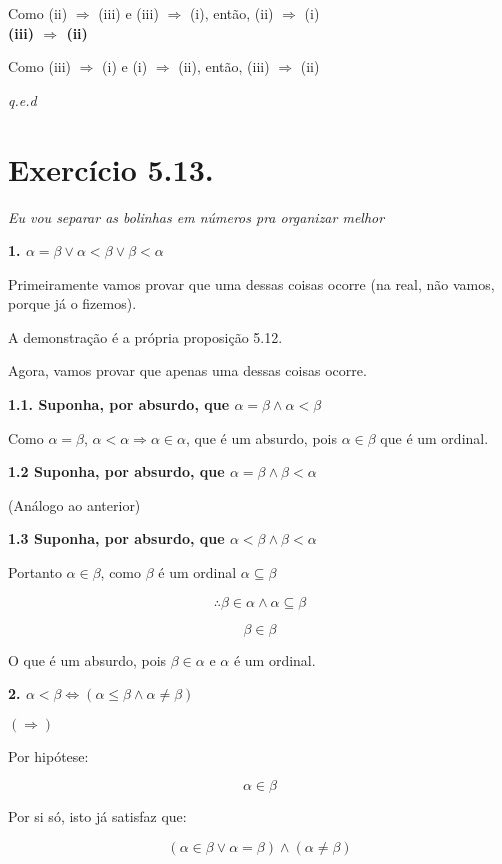 \documentclass[12pt]{extarticle}
\newcommand{\fim}{\begin{flushright}

   \emph{q.e.d}
\end{flushright}}
\begin{document}
Como (ii) $\Rightarrow$ (iii) e (iii) $\Rightarrow$ (i), então, (ii) $\Rightarrow$ (i)
\\
\textbf{(iii) $\Rightarrow$ (ii)}

Como (iii) $\Rightarrow$ (i) e (i) $\Rightarrow$ (ii), então, (iii) $\Rightarrow$ (ii)

\fim

\section{Exercício 5.13.}

\textit{Eu vou separar as bolinhas em números pra organizar melhor}

\textbf{1. $\alpha = \beta \lor \alpha < \beta \lor \beta < \alpha$}

Primeiramente vamos provar que uma dessas coisas ocorre (na real, não vamos, porque já o fizemos).

A demonstração é a própria proposição 5.12.

Agora, vamos provar que apenas uma dessas coisas ocorre. 

\textbf{1.1. Suponha, por absurdo, que $\alpha = \beta \land \alpha < \beta$}

Como $\alpha = \beta$, $\alpha < \alpha \Rightarrow \alpha \in \alpha$, que é um absurdo, pois $\alpha \in \beta$ que é um ordinal.

\textbf{1.2 Suponha, por absurdo, que $\alpha = \beta  \land \beta < \alpha$}

(Análogo ao anterior)

\textbf{1.3 Suponha, por absurdo, que $ \alpha < \beta \land \beta < \alpha$}

Portanto $\alpha \in \beta$, como $\beta$ é um ordinal $\alpha \subseteq \beta$

$$
\therefore \beta \in \alpha \land \alpha \subseteq \beta
$$

$$
\beta \in \beta
$$

O que é um absurdo, pois $\beta \in \alpha$ e $\alpha$ é um ordinal.

\textbf{2. $\alpha < \beta \Leftrightarrow (\alpha \leq \beta \land \alpha \neq \beta)$}

$(\Rightarrow)$

Por hipótese:

$$
\alpha \in \beta
$$

Por si só, isto já satisfaz que:

$$
(\alpha \in \beta \lor \alpha = \beta) \land (\alpha \neq \beta)
$$
\end{document}
